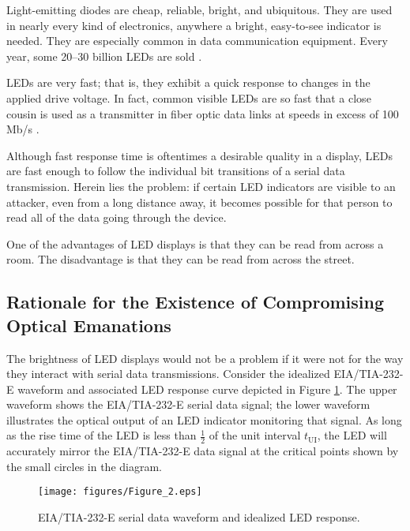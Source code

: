 \documentclass{acmtrans2e}
\begin{document}
Light-emitting diodes are cheap, reliable, bright, and ubiquitous.  They 
are used in nearly every kind of electronics, anywhere a bright, 
easy-to-see indicator is needed.  They are especially common in
data communication equipment.  Every year, some 
20--30 billion LEDs are sold \cite{led_shipments}.

LEDs are very fast; that is, they exhibit a quick response to 
changes in the applied drive voltage.  In fact, common visible LEDs
are so fast that a close cousin is used as a transmitter in fiber
optic data links at speeds in excess of 100 Mb/s
\cite{hp_fiber_optic_data_sheet}.

Although fast response time is oftentimes a desirable quality in a 
display, LEDs are fast enough to follow the individual bit transitions 
of a serial data transmission.  Herein lies the problem: if certain LED 
indicators are visible to an attacker, even from a long distance away,
it becomes possible for that person to read all of the data going through the 
device.

One of the advantages of LED displays is that they can be read from 
across a room.  The disadvantage is that they can be read from across 
the street.

\subsection{Rationale for the Existence of Compromising Optical 
Emanations}

The brightness of LED displays would not be a problem if it were not for 
the way they interact with serial data transmissions.  Consider the
idealized EIA/TIA-232-E waveform and associated LED response curve depicted in
Figure \ref{idealized_led_response_figure}.  The upper waveform shows
the EIA/TIA-232-E serial data signal; the lower waveform illustrates
the optical output of an LED indicator monitoring that signal.  As long
as the rise time of
the LED is less than $\frac{1}{2}$ of the unit interval $t_\mathrm{UI}$,
the LED will accurately mirror the EIA/TIA-232-E data signal at the
critical points shown by the small circles in the diagram.

\begin{figure}
\centering
\texttt{[image: figures/Figure\_2.eps]}
\caption{EIA/TIA-232-E serial data waveform and idealized LED response.}
\label{idealized_led_response_figure}
\end{figure}
\end{document}
